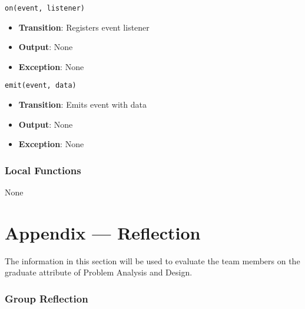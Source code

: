 \documentclass[12pt, titlepage]{article}
\begin{document}
\texttt{on(event, listener)}
\begin{itemize}
\item \textbf{Transition}: Registers event listener
\item \textbf{Output}: None
\item \textbf{Exception}: None
\end{itemize}

\texttt{emit(event, data)}
\begin{itemize}
\item \textbf{Transition}: Emits event with data
\item \textbf{Output}: None
\item \textbf{Exception}: None
\end{itemize}

\subsubsection{Local Functions}
None


\newpage

\section{Appendix --- Reflection}


The information in this section will be used to evaluate the team members on the
graduate attribute of Problem Analysis and Design.



\subsubsection*{Group Reflection}
\end{document}
